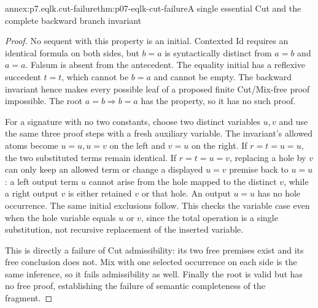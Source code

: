 \begin{annexitem}{annex:p7.eqlk.cut-failure}{thm:p07-eqlk-cut-failure}{A single essential Cut and the complete backward branch invariant}
\begin{proof}
No sequent with this property is an initial. Contexted Id requires an
identical formula on both sides, but \(b=a\) is syntactically distinct
from \(a=b\) and \(a=a\). Falsum is absent from the antecedent.
The equality initial has a reflexive succedent \(t=t\), which cannot
be \(b=a\) and cannot be empty. The backward invariant hence makes
every possible leaf of a proposed finite Cut/Mix-free proof impossible.
The root \(a=b\Rightarrow b=a\) has the property, so it has no such proof.

For a signature with no two constants, choose two distinct variables
\(u,v\) and use the same three proof steps with a fresh auxiliary
variable. The invariant's allowed atoms become \(u=u,u=v\) on the
left and \(v=u\) on the right. If \(r=t=u=u\), the two substituted
terms remain identical. If \(r=t=u=v\), replacing a hole by \(v\)
can only keep an allowed term or change a displayed \(u=v\) premise
back to \(u=u\): a left output term \(u\) cannot arise from the
hole mapped to the distinct \(v\), while a right output \(v\) is
either retained \(v\) or that hole. An output \(u=u\) has no hole
occurrence. The same initial exclusions follow. This checks the
variable case even when the hole variable equals \(u\) or \(v\),
since the total operation is a single substitution, not recursive
replacement of the inserted variable.

This is directly a failure of Cut admissibility: its two free premises
exist and its free conclusion does not. Mix with one selected occurrence
on each side is the same inference, so it fails admissibility as well.
Finally the root is valid but has no free proof, establishing the
failure of semantic completeness of the fragment.
\end{proof}
\end{annexitem}
